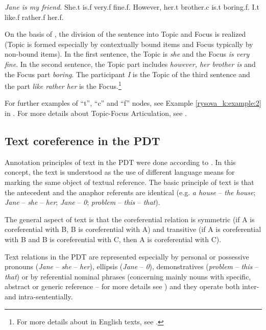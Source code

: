 \documentclass[output=paper]{langsci/langscibook.cls}
\begin{document}
\ea
\label{ex:1}
{\ob}\textit{Jane is my friend.{\cb}} She.t is.f very.f fine.f. However, her.t brother.c is.t boring.f. I.t like.f rather.f her.f. \\
\z

On the basis of , the division of the sentence into Topic and Focus is realized (Topic is formed especially by contextually bound items and Focus typically by non-bound items). In the first sentence, the Topic is \textit{she} and the Focus \textit{is very fine}. In the second sentence, the Topic part includes \textit{however, her brother is} and the Focus part \textit{boring}. The participant \textit{I} is the Topic of the third sentence and the part \textit{like rather her} is the Focus.\footnote{For more details about  in English texts, see \citet{Rysova2015Topic}.}

For further examples of ``t'', ``c'' and ``f'' nodes, see Example \ref{rysova_k:example:2} in . For more details about Topic-Focus Articulation, see \citet{hajicova1998topic}.

\subsection{Text coreference in the PDT\label{rysova_k:sec:TextCoreference}}

Annotation principles of text  in the PDT were done according to \citet{Nedoluzhko2011}. In this concept, the text  is understood as the use of different language means for marking the same object of textual reference. The basic principle of text  is that the antecedent and the anaphor referents are identical (e.g. \textit{a house} -- \textit{the house}; \textit{Jane} -- \textit{she} --\textit{ her}; \textit{Jane} -- \textit{0}; \textit{problem} -- \textit{this} -- \textit{that}).

The general aspect of text  is that the coreferential relation is symmetric (if A is coreferential with B, B is coreferential with A) and transitive (if A is coreferential with B and B is coreferential with C, then A is coreferential with C).

Text  relations in the PDT are represented especially by personal or possessive pronouns (\textit{Jane} -- \textit{she} -- \textit{her}), ellipsis (\textit{Jane }-- \textit{0}), demonstratives (\textit{problem} -- \textit{this }-- \textit{that}) or by referential nominal phrases (concerning mainly nouns with specific, abstract or generic reference -- for more details see \citet{Nedoluzhko2011}) and they operate both inter- and intra-sententially.
\end{document}
